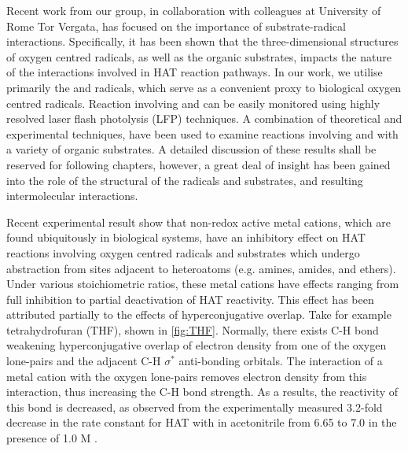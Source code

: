 Recent work from our group, in collaboration with colleagues at University of
Rome Tor Vergata, has focused on the importance of substrate-radical
interactions. Specifically, it has been shown that the three-dimensional
structures of oxygen centred radicals, as well as the organic substrates,
impacts the nature of the interactions involved in HAT reaction pathways. In our
work, we utilise primarily the \bno and \cumo radicals, which serve as a
convenient proxy to biological oxygen centred radicals. Reaction involving \bno
and \cumo can be easily monitored using highly resolved laser flash photolysis
(LFP) techniques. A combination of theoretical and experimental techniques, have
been used to examine reactions involving \bno and \cumo with a variety of
organic substrates. A detailed discussion of these results shall be reserved for
following chapters, however, a great deal of insight has been gained into the
role of the structural of the radicals and substrates, and resulting
intermolecular interactions.

Recent experimental result show that non-redox active metal cations, which are
found ubiquitously in biological systems, have an inhibitory effect on HAT
reactions involving oxygen centred radicals and substrates which undergo
abstraction from sites adjacent to heteroatoms (e.g. amines, amides, and
ethers). Under various stoichiometric ratios, these metal cations have effects
ranging from full inhibition to partial deactivation of HAT
reactivity.\cite{Salamone2013,Salamone2015metals,Salamone2016} This effect has
been attributed partially to the effects of hyperconjugative overlap. Take for
example tetrahydrofuran (THF), shown in \ref{fig:THF}. Normally, there exists
C-H bond weakening hyperconjugative overlap of electron density from one of the
oxygen lone-pairs and the adjacent C-H $\sigma^*$ anti-bonding orbitals. The
interaction of a metal cation with the oxygen lone-pairs removes electron
density from this interaction, thus increasing the C-H bond strength. As a
results, the reactivity of this bond is decreased, as observed from the
experimentally measured 3.2-fold decrease in the rate constant for HAT with
\cumo in acetonitrile from 6.65  \Ms to 7.0  \Ms in the presence of
1.0 M .\cite{Salamone2013}


